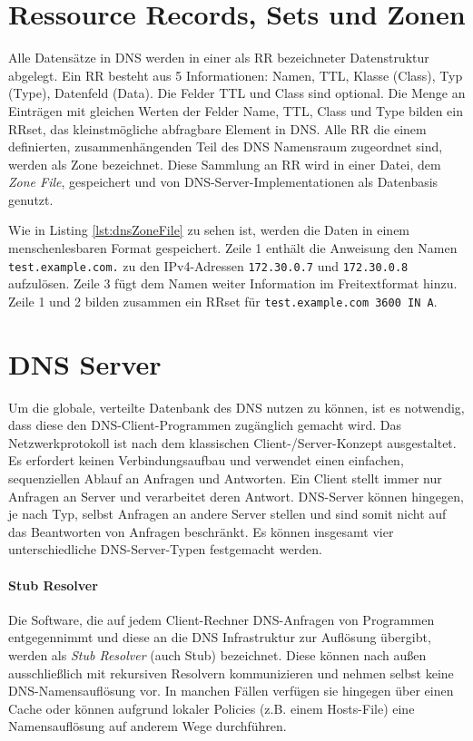 \section{Ressource Records, Sets und Zonen}
Alle Datensätze in DNS werden in einer als \ac{RR} bezeichneter Datenstruktur abgelegt. Ein \ac{RR} besteht aus 5 Informationen: Namen, \ac{TTL}, Klasse (Class), Typ (Type), Datenfeld (Data). Die Felder \ac{TTL} und Class sind optional. Die Menge an Einträgen mit gleichen Werten der Felder Name, TTL, Class und Type bilden ein \ac{RRset}\cite{rfc2181}, das kleinstmögliche abfragbare Element in DNS. Alle \ac{RR} die einem definierten, zusammenhängenden Teil des DNS Namensraum zugeordnet sind, werden als Zone bezeichnet. Diese Sammlung an RR wird in einer Datei, dem \textit{Zone File}, gespeichert und von DNS-Server-Implementationen als Datenbasis genutzt.   

Wie in Listing \ref{lst:dnsZoneFile} zu sehen ist, werden die Daten in einem menschenlesbaren Format gespeichert. Zeile 1 enthält die Anweisung den Namen \texttt{test.example.com.} zu den IPv4-Adressen \texttt{172.30.0.7} und \texttt{172.30.0.8} aufzulösen. Zeile 3 fügt dem Namen weiter Information im Freitextformat hinzu. Zeile 1 und 2 bilden zusammen ein RRset für \texttt{test.example.com 3600 IN A}.



\section{DNS Server}
\label{sec:dnsserver}
Um die globale, verteilte Datenbank des DNS nutzen zu können, ist es notwendig, dass diese den DNS-Client-Programmen zugänglich gemacht wird. Das Netzwerkprotokoll ist nach dem klassischen Client-/Server-Konzept ausgestaltet. Es erfordert keinen Verbindungsaufbau und verwendet einen einfachen, sequenziellen Ablauf an Anfragen und Antworten. Ein Client stellt immer nur Anfragen an Server und verarbeitet deren Antwort. DNS-Server können hingegen, je nach Typ, selbst Anfragen an andere Server stellen und sind somit nicht auf das Beantworten von Anfragen beschränkt. Es können insgesamt vier unterschiedliche DNS-Server-Typen festgemacht werden.

\paragraph{Stub Resolver}
Die Software, die auf jedem Client-Rechner DNS-Anfragen von Programmen entgegennimmt und diese an die DNS Infrastruktur zur Auflösung übergibt, werden als \textit{Stub Resolver} (auch Stub) bezeichnet. Diese können nach außen ausschließlich mit rekursiven Resolvern kommunizieren und nehmen selbst keine DNS-Namensauflösung vor. In manchen Fällen verfügen sie hingegen über einen Cache oder können aufgrund lokaler Policies (z.B. einem Hosts-File) eine Namensauflösung auf anderem Wege durchführen.

